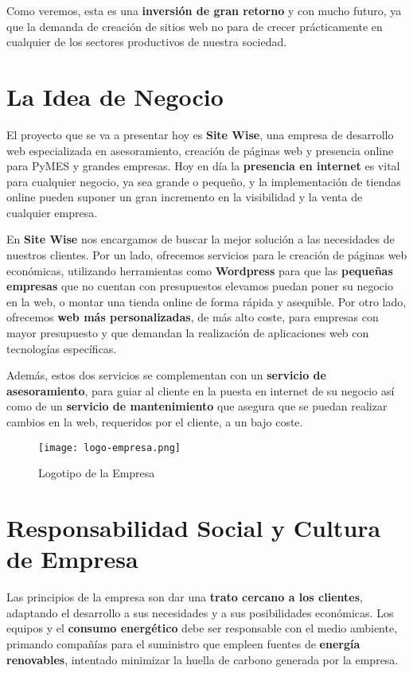 Como veremos, esta es una \textbf{inversión de gran retorno} y con mucho futuro, ya que la demanda de creación de sitios web no para de crecer prácticamente en cualquier de los sectores productivos de nuestra sociedad.


\section{La Idea de Negocio}
El proyecto que se va a presentar hoy es \textbf{Site Wise}, una empresa de desarrollo web especializada en asesoramiento, creación de páginas web y presencia online para PyMES y grandes empresas. Hoy en día la \textbf{presencia en internet} es vital para cualquier negocio, ya sea grande o pequeño, y la implementación de tiendas online pueden suponer un gran incremento en la visibilidad y la venta de cualquier empresa.

En \textbf{Site Wise} nos encargamos de buscar la mejor solución a las necesidades de nuestros clientes. Por un lado, ofrecemos servicios para le creación de páginas web económicas, utilizando herramientas como \textbf{Wordpress} para que las \textbf{pequeñas empresas} que no cuentan con presupuestos elevamos puedan poner su negocio en la web, o montar una tienda online de forma rápida y asequible. Por otro lado, ofrecemos \textbf{web más personalizadas}, de más alto coste, para empresas con mayor presupuesto y que demandan la realización de aplicaciones web con tecnologías específicas.

Además, estos dos servicios se complementan con un \textbf{servicio de asesoramiento}, para guiar al cliente en la puesta en internet de su negocio así como de un \textbf{servicio de mantenimiento} que asegura que se puedan realizar cambios en la web, requeridos por el cliente, a un bajo coste.

\begin{figure}[H]
    \centering
    \texttt{[image: logo-empresa.png]}
    \caption{Logotipo de la Empresa}
\end{figure}

\section{Responsabilidad Social y Cultura de Empresa}
Las principios de la empresa son dar una \textbf{trato cercano a los clientes}, adaptando el desarrollo a sus necesidades y a sus posibilidades económicas. Los equipos y el \textbf{consumo energético} debe ser responsable con el medio ambiente, primando compañías para el suministro que empleen fuentes de \textbf{energía renovables}, intentado minimizar la huella de carbono generada por la empresa.


